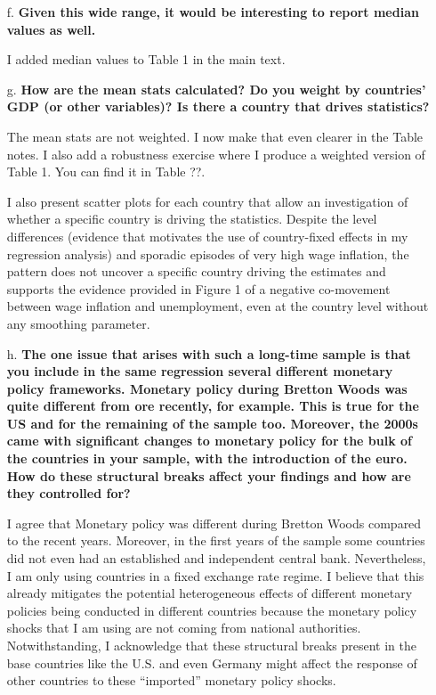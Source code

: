 \documentclass[12pt]{article}
\begin{document}
\begin{enumerate}
\begin{itemize}
    \item[f.] \textbf{Given this wide range, it would be interesting to report median values as well.}

I added median values to Table 1 in the main text.

    \item[g.] \textbf{How are the mean stats calculated? Do you weight by countries' GDP (or other variables)? Is there a country that drives statistics?}

The mean stats are not weighted. I now make that even clearer in the Table notes. I also add a robustness exercise where I produce a weighted version of Table 1. You can find it in Table ??.

I also present scatter plots for each country that allow an investigation of whether a specific country is driving the statistics. Despite the level differences (evidence that motivates the use of country-fixed effects in my regression analysis) and sporadic episodes of very high wage inflation, the pattern does not uncover a specific country driving the estimates and supports the evidence provided in Figure 1 of a negative co-movement between wage inflation and unemployment, even at the country level without any smoothing parameter.


    \item[h.] \textbf{The one issue that arises with such a long-time sample is that you include in the same regression several different monetary policy frameworks. Monetary policy during Bretton Woods was quite different from ore recently, for example. This is true for the US and for the remaining of the sample too. Moreover, the 2000s came with significant changes to monetary policy for the bulk of the countries in your sample, with the introduction of the euro. How do these structural breaks affect your findings and how are they controlled for?}

I agree that Monetary policy was different during Bretton Woods compared to the recent years. Moreover, in the first years of the sample some countries did not even had an established and independent central bank. Nevertheless, I am only using countries in a fixed exchange rate regime. I believe that this already mitigates the potential heterogeneous effects of different monetary policies being conducted in different countries because the monetary policy shocks that I am using are not coming from national authorities. Notwithstanding, I acknowledge that these structural breaks present in the base countries like the U.S. and even Germany might affect the response of other countries to these “imported” monetary policy shocks.


\end{itemize}
\end{enumerate}
\end{document}
